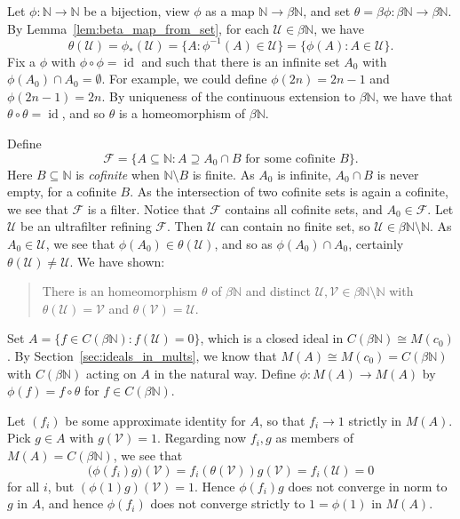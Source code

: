 \documentclass[a4paper,12pt]{article}
\theoremstyle{plain}
\theoremstyle{definition}
\newcommand{\mc}[1]{\mathcal{#1}}
\newcommand{\id}{\operatorname{id}}
\begin{document}
Let $\phi:\mathbb N\rightarrow\mathbb N$ be a bijection, view $\phi$ as a map $\mathbb N\rightarrow
\beta\mathbb N$, and set $\theta = \beta\phi:\beta\mathbb N \rightarrow \beta\mathbb N$.  By
Lemma~\ref{lem:beta_map_from_set}, for each $\mc U\in\beta\mathbb N$, we have
\[ \theta(\mc U) = \phi_*(\mc U) = \{ A : \phi^{-1}(A) \in\mc U \}
= \{ \phi(A) : A\in\mc U \}. \]
Fix a $\phi$ with $\phi\circ\phi=\id$ and such that there is an infinite set $A_0$ with $\phi(A_0)
\cap A_0 = \emptyset$.  For example, we could define $\phi(2n) = 2n-1$ and $\phi(2n-1)=2n$.
By uniqueness of the continuous extension to $\beta\mathbb N$, we have that $\theta\circ\theta=\id$,
and so $\theta$ is a homeomorphism of $\beta\mathbb N$.

Define
\[ \mc F = \{ A\subseteq\mathbb N : A \supseteq A_0\cap B \text{ for some cofinite }B \}. \]
Here $B\subseteq\mathbb N$ is \emph{cofinite} when $\mathbb N\setminus B$ is finite.  As $A_0$ is infinite,
$A_0\cap B$ is never empty, for a cofinite $B$.  As the intersection of two cofinite sets is again a cofinite,
we see that $\mc F$ is a filter.  Notice that $\mc F$ contains all cofinite sets, and $A_0\in\mc F$.
Let $\mc U$ be an ultrafilter refining $\mc F$.  Then $\mc U$ can contain no finite set, so $\mc U
\in \beta\mathbb N \setminus \mathbb N$.  As $A_0\in\mc U$, we see that $\phi(A_0) \in \theta(\mc U)$,
and so as $\phi(A_0)\cap A_0$, certainly $\theta(\mc U) \not= \mc U$.  We have shown:

\begin{quote}
There is an homeomorphism $\theta$ of $\beta\mathbb N$ and distinct $\mc U, \mc V\in \beta\mathbb N \setminus \mathbb N$ with $\theta(\mc U) = \mc V$ and $\theta(\mc V) = \mc U$.
\end{quote}

Set $A = \{ f\in C(\beta\mathbb N) : f(\mc U)=0 \}$, which is a closed ideal in $C(\beta\mathbb N)
\cong M(c_0)$.  By Section~\ref{sec:ideals_in_mults}, we know that $M(A) \cong M(c_0) = C(\beta\mathbb N)$
with $C(\beta\mathbb N)$ acting on $A$ in the natural way.  Define $\phi: M(A)\rightarrow M(A)$ by
$\phi(f) = f\circ\theta$ for $f\in C(\beta\mathbb N)$.

Let $(f_i)$ be some approximate identity for $A$, so that $f_i \rightarrow 1$ strictly in $M(A)$.
Pick $g\in A$ with $g(\mc V)=1$.  Regarding now $f_i, g$ as members of $M(A) = C(\beta\mathbb N)$,
we see that
\[ \big( \phi(f_i) g \big)(\mc V) = f_i(\theta(\mc V)) g(\mc V) = f_i(\mc U) = 0 \]
for all $i$, but $(\phi(1)g)(\mc V) = 1$.  Hence $\phi(f_i)g$ does not converge in norm to $g$ in $A$,
and hence $\phi(f_i)$ does not converge strictly to $1 = \phi(1)$ in $M(A)$.
\end{document}
